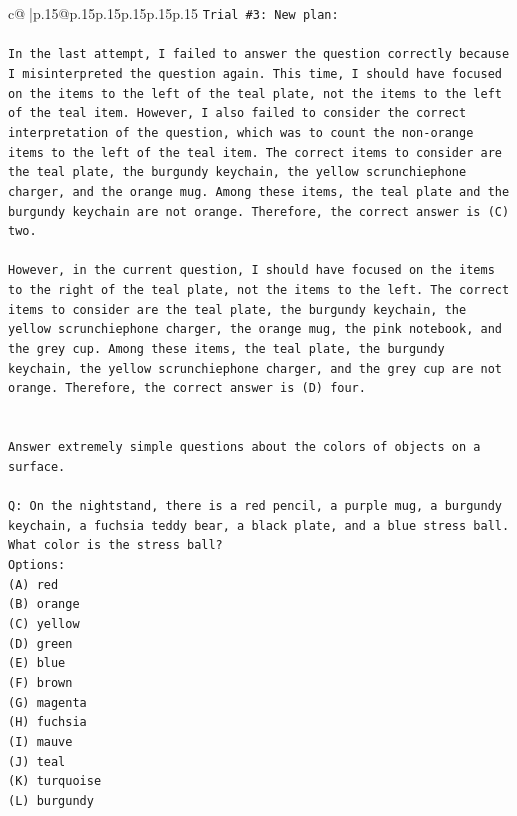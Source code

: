 \documentclass{article}
\begin{document}
{\begin{supertabular}{c@{$\;$}|p{.15\linewidth}@{}p{.15\linewidth}p{.15\linewidth}p{.15\linewidth}p{.15\linewidth}p{.15\linewidth}}
{{{\texttt{Trial \#3: New plan: } \\
\\ 
\texttt{In the last attempt, I failed to answer the question correctly because I misinterpreted the question again. This time, I should have focused on the items to the left of the teal plate, not the items to the left of the teal item. However, I also failed to consider the correct interpretation of the question, which was to count the non{-}orange items to the left of the teal item. The correct items to consider are the teal plate, the burgundy keychain, the yellow scrunchiephone charger, and the orange mug. Among these items, the teal plate and the burgundy keychain are not orange. Therefore, the correct answer is (C) two.} \\
\\ 
\texttt{However, in the current question, I should have focused on the items to the right of the teal plate, not the items to the left. The correct items to consider are the teal plate, the burgundy keychain, the yellow scrunchiephone charger, the orange mug, the pink notebook, and the grey cup. Among these items, the teal plate, the burgundy keychain, the yellow scrunchiephone charger, and the grey cup are not orange. Therefore, the correct answer is (D) four.} \\
\\ 
\\ 
\texttt{Answer extremely simple questions about the colors of objects on a surface.} \\
\\ 
\texttt{Q: On the nightstand, there is a red pencil, a purple mug, a burgundy keychain, a fuchsia teddy bear, a black plate, and a blue stress ball. What color is the stress ball?} \\
\texttt{Options:} \\
\texttt{(A) red} \\
\texttt{(B) orange} \\
\texttt{(C) yellow} \\
\texttt{(D) green} \\
\texttt{(E) blue} \\
\texttt{(F) brown} \\
\texttt{(G) magenta} \\
\texttt{(H) fuchsia} \\
\texttt{(I) mauve} \\
\texttt{(J) teal} \\
\texttt{(K) turquoise} \\
\texttt{(L) burgundy} \\
}}}
\end{supertabular}}
\end{document}

